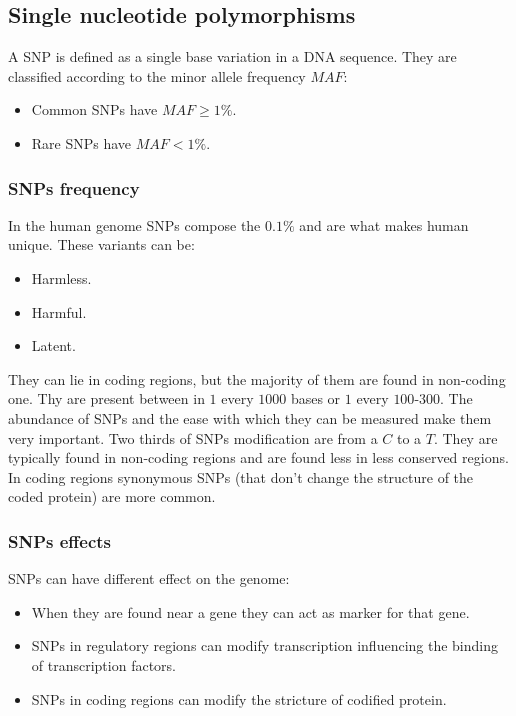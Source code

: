 	\subsection{Single nucleotide polymorphisms}
	A SNP is defined as a single base variation in a DNA sequence.
	They are classified according to the minor allele frequency $MAF$:

	\begin{multicols}{2}
		\begin{itemize}
			\item Common SNPs have $MAF \ge 1\%$.
			\item Rare SNPs have $MAF < 1\%$.
		\end{itemize}
	\end{multicols}

		\subsubsection{SNPs frequency}
		In the human genome SNPs compose the $0.1\%$ and are what makes human unique.
		These variants can be:

		\begin{multicols}{3}
			\begin{itemize}
				\item Harmless.
				\item Harmful.
				\item Latent.
			\end{itemize}
		\end{multicols}

		They can lie in coding regions, but the majority of them are found in non-coding one.
		Thy are present between in $1$ every $1000$ bases or $1$ every $100$-$300$.
		The abundance of SNPs and the ease with which they can be measured make them very important.
		Two thirds of SNPs modification are from a $C$ to a $T$.
		They are typically found in non-coding regions and are found less in less conserved regions.
		In coding regions synonymous SNPs (that don't change the structure of the coded protein) are more common.

		\subsubsection{SNPs effects}
		SNPs can have different effect on the genome:

		\begin{multicols}{2}
			\begin{itemize}
				\item When they are found near a gene they can act as marker for that gene.
				\item SNPs in regulatory regions can modify transcription influencing the binding of transcription factors.
				\item SNPs in coding regions can modify the stricture of codified protein.
			\end{itemize}
		\end{multicols}

